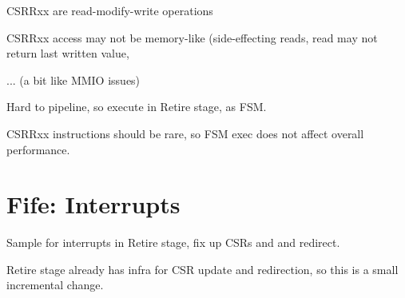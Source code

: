 \begin{tightlist}
\item CSRRxx are read-modify-write operations
\item CSRRxx access may not be memory-like (side-effecting reads, read
      may not return last written value,
\item ... (a bit like MMIO issues)
\end{tightlist}
Hard to pipeline, so execute in Retire stage, as FSM.

CSRRxx instructions should be rare, so FSM exec does not affect overall performance.


\section{Fife: Interrupts}

Sample for interrupts in Retire stage, fix up CSRs and and redirect.

Retire stage already has infra for CSR update and redirection, so this
is a small incremental change.

